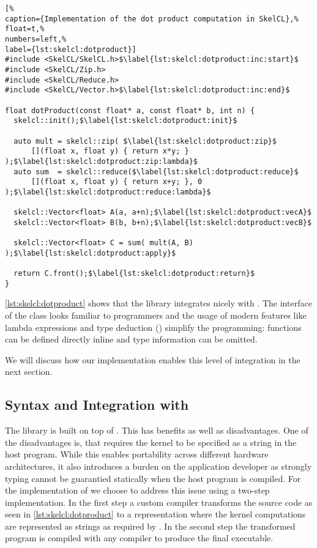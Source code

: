 \begin{lstlisting}[%                                                             
caption={Implementation of the dot product computation in SkelCL},%
float=t,%
numbers=left,%
label={lst:skelcl:dotproduct}]
#include <SkelCL/SkelCL.h>$\label{lst:skelcl:dotproduct:inc:start}$
#include <SkelCL/Zip.h>
#include <SkelCL/Reduce.h>
#include <SkelCL/Vector.h>$\label{lst:skelcl:dotproduct:inc:end}$

float dotProduct(const float* a, const float* b, int n) {
  skelcl::init();$\label{lst:skelcl:dotproduct:init}$

  auto mult = skelcl::zip( $\label{lst:skelcl:dotproduct:zip}$
      [](float x, float y) { return x*y; } );$\label{lst:skelcl:dotproduct:zip:lambda}$
  auto sum  = skelcl::reduce($\label{lst:skelcl:dotproduct:reduce}$
      [](float x, float y) { return x+y; }, 0 );$\label{lst:skelcl:dotproduct:reduce:lambda}$

  skelcl::Vector<float> A(a, a+n);$\label{lst:skelcl:dotproduct:vecA}$
  skelcl::Vector<float> B(b, b+n);$\label{lst:skelcl:dotproduct:vecB}$

  skelcl::Vector<float> C = sum( mult(A, B) );$\label{lst:skelcl:dotproduct:apply}$

  return C.front();$\label{lst:skelcl:dotproduct:return}$
}
\end{lstlisting}

\autoref{lst:skelcl:dotproduct} shows that the \SkelCL library integrates nicely with \Cpp.
The interface of the  class looks familiar to \Cpp programmers and the usage of modern \Cpp features like lambda expressions and type deduction () simplify the programming:
functions can be defined directly inline and type information can be omitted.

We will discuss how our implementation enables this level of integration in the next section.


\subsection{Syntax and Integration with \Cpp}
\label{section:skelcl-library:syntax}

The \SkelCL library is built on top of \OpenCL.
This has benefits as well as disadvantages.
One of the disadvantages is, that \OpenCL requires the kernel to be specified as a string in the host program.
While this enables portability across different hardware architectures, it also introduces a burden on the application developer as strongly typing cannot be guarantied statically when the host program is compiled.
For the implementation of \SkelCL we choose to address this issue using a two-step implementation.
In the first step a custom compiler transforms the source code as seen in \autoref{lst:skelcl:dotproduct} to a representation where the kernel computations are represented as strings as required by \OpenCL.
In the second step the transformed program is compiled with any \Cpp compiler to produce the final executable.

